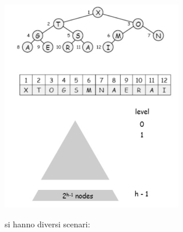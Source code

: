 \documentclass[a4paper,12pt, oneside]{book}
\begin{document}
\begin{center}
\includegraphics[scale=3]{img/c8.png}
\end{center}
si hanno diversi scenari:
\end{document}
